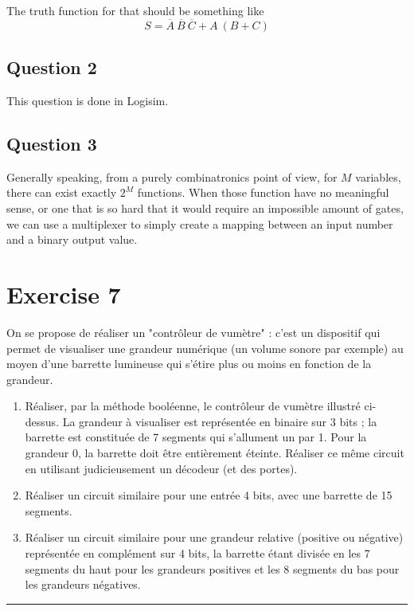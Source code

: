 \documentclass[a4paper,10pt]{article}
\def\centralruler{\begin{center}\rule{5cm}{.1pt}\end{center}}
\begin{document}
The truth function for that should be something like
\[
	S=\overline{A}~\overline{B}~\overline{C}+A~(B+C)
\]

\subsection{Question 2}

This question is done in Logisim.

\subsection{Question 3}

Generally speaking, from a purely combinatronics point of view, for $M$ variables, there can exist exactly $2^M$ functions. When those function have no meaningful sense, or one that is so hard that it would require an impossible amount of gates, we can use a multiplexer to simply create a mapping between an input number and a binary output value.

\section{Exercise 7}

On se propose de réaliser un "contrôleur de vumètre" : c'est un dispositif qui permet de visualiser une grandeur numérique (un volume sonore par exemple) au moyen d'une barrette lumineuse qui s'étire plus ou moins en fonction de la grandeur.

\begin{enumerate}
	\item Réaliser, par la méthode booléenne, le contrôleur de vumètre illustré ci-dessus. La grandeur à visualiser est représentée en binaire sur 3 bits ; la barrette est constituée de 7 segments qui s'allument un par 1. Pour la grandeur 0, la barrette doit être entièrement éteinte. Réaliser ce même circuit en utilisant judicieusement un décodeur (et des portes).
	\item Réaliser un circuit similaire pour une entrée 4 bits, avec une barrette de 15 segments.
	\item Réaliser un circuit similaire pour une grandeur relative (positive ou négative) représentée en complément sur 4 bits, la barrette étant divisée en les 7 segments du haut pour les grandeurs positives et les 8 segments du bas pour les grandeurs négatives.
\end{enumerate}

\centralruler
\end{document}
